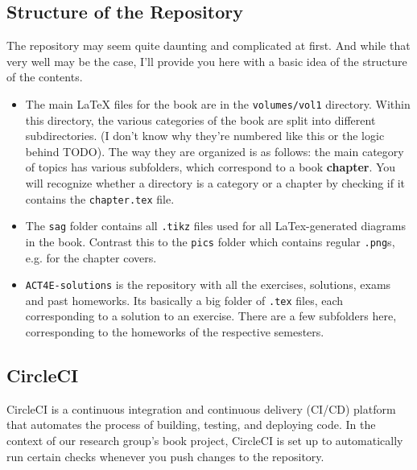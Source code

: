 \documentclass{article}
\begin{document}
    \subsection{Structure of the Repository}
    The repository may seem quite daunting and complicated at first.
    And while that very well may be the case, I'll provide you here with a basic idea of the structure of the contents.
    \begin{itemize}
        \item The main LaTeX files for the book are in the \texttt{volumes/vol1} directory.
              Within this directory, the various categories of the book are split into different subdirectories.
              (I don't know why they're numbered like this or the logic behind TODO).
              The way they are organized is as follows: the main category of topics has various subfolders, which correspond to a book \textbf{chapter}.
              You will recognize whether a directory is a category or a chapter by checking if it contains the \texttt{chapter.tex} file.
        \item The \texttt{sag} folder contains all \texttt{.tikz} files used for all LaTex-generated diagrams in the book.
              Contrast this to the \texttt{pics} folder which contains regular \texttt{.png}s, e.g. for the chapter covers.
        \item \texttt{ACT4E-solutions} is the repository with all the exercises, solutions, exams and past homeworks.
              Its basically a big folder of \texttt{.tex} files, each corresponding to a solution to an exercise.
              There are a few subfolders here, corresponding to the homeworks of the respective semesters.
    \end{itemize}

    \subsection{CircleCI}

    CircleCI is a continuous integration and continuous delivery (CI/CD) platform that automates the process of building, testing, and deploying code.
    In the context of our research group's book project, CircleCI is set up to automatically run certain checks whenever you push changes to the repository.
\end{document}
